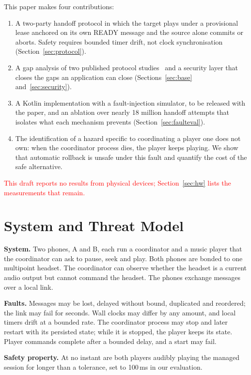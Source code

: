 \documentclass[conference]{IEEEtran}
\newcommand{\draftnote}[1]{\textcolor{red}{#1}}
\begin{document}
This paper makes four contributions:
\begin{enumerate}
\item A two-party handoff protocol in which the target plays under a provisional lease anchored on its own READY message and the source alone commits or aborts. Safety requires bounded timer drift, not clock synchronisation (Section~\ref{sec:protocol}).
\item A gap analysis of two published protocol studies~\cite{stute2021,antonioli2019} and a security layer that closes the gaps an application can close (Sections~\ref{sec:base} and~\ref{sec:security}).
\item A Kotlin implementation with a fault-injection simulator, to be released with the paper, and an ablation over nearly 18 million handoff attempts that isolates what each mechanism prevents (Section~\ref{sec:faulteval}).
\item The identification of a hazard specific to coordinating a player one does not own: when the coordinator process dies, the player keeps playing. We show that automatic rollback is unsafe under this fault and quantify the cost of the safe alternative.
\end{enumerate}

\draftnote{This draft reports no results from physical devices; Section~\ref{sec:hw} lists the measurements that remain.}

\section{System and Threat Model}\label{sec:model}

\textbf{System.} Two phones, A and B, each run a coordinator and a music player that the coordinator can ask to pause, seek and play. Both phones are bonded to one multipoint headset. The coordinator can observe whether the headset is a current audio output but cannot command the headset. The phones exchange messages over a local link.

\textbf{Faults.} Messages may be lost, delayed without bound, duplicated and reordered; the link may fail for seconds. Wall clocks may differ by any amount, and local timers drift at a bounded rate. The coordinator process may stop and later restart with its persisted state; while it is stopped, the player keeps its state. Player commands complete after a bounded delay, and a start may fail.

\textbf{Safety property.} At no instant are both players audibly playing the managed session for longer than a tolerance, set to 100\,ms in our evaluation.
\end{document}
